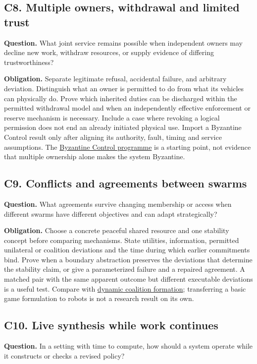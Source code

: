 \documentclass[11pt]{article}
\begin{document}
\subsection{C8. Multiple owners, withdrawal and limited trust}
\textbf{Question.} What joint service remains possible when independent owners may decline new work, withdraw resources, or supply evidence of differing trustworthiness?

\textbf{Obligation.} Separate legitimate refusal, accidental failure, and arbitrary deviation. Distinguish what an owner is permitted to do from what its vehicles can physically do. Prove which inherited duties can be discharged within the permitted withdrawal model and when an independently effective enforcement or reserve mechanism is necessary. Include a case where revoking a logical permission does not end an already initiated physical use. Import a Byzantine Control result only after aligning its authority, fault, timing and service assumptions. The \href{https://github.com/eternal-november/eos-research-programmes/blob/e1348964f73704212d2d8b48d5982a5ed600a2ff/projects/byzantine-control/research/PROGRAM-CONTRACT.md#L13-L37}{Byzantine Control programme} is a starting point, not evidence that multiple ownership alone makes the system Byzantine.

\subsection{C9. Conflicts and agreements between swarms}
\textbf{Question.} What agreements survive changing membership or access when different swarms have different objectives and can adapt strategically?

\textbf{Obligation.} Choose a concrete peaceful shared resource and one stability concept before comparing mechanisms. State utilities, information, permitted unilateral or coalition deviations and the time during which earlier commitments bind. Prove when a boundary abstraction preserves the deviations that determine the stability claim, or give a parameterized failure and a repaired agreement. A matched pair with the same apparent outcome but different executable deviations is a useful test. Compare with \href{https://www.sciencedirect.com/science/article/pii/S016726810200015X}{dynamic coalition formation}; transferring a basic game formulation to robots is not a research result on its own.

\subsection{C10. Live synthesis while work continues}
\textbf{Question.} In a setting with time to compute, how should a system operate while it constructs or checks a revised policy?
\end{document}
